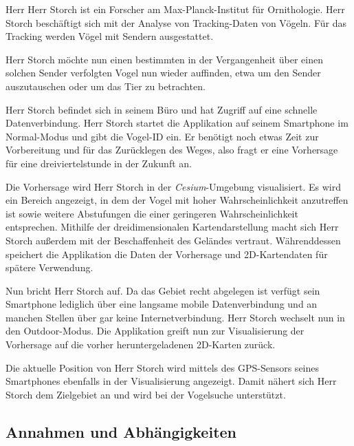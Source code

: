 \documentclass[12pt]{article} %
\begin{document}
\begin{displayquote}
\small
Herr Herr Storch ist ein Forscher am Max-Planck-Institut für Ornithologie. Herr Storch beschäftigt sich mit der Analyse von Tracking-Daten von Vögeln. Für das Tracking werden Vögel mit Sendern ausgestattet. 

Herr Storch möchte nun einen bestimmten in der Vergangenheit über einen solchen Sender verfolgten Vogel nun wieder auffinden, etwa um den Sender auszutauschen oder um das Tier zu betrachten.

Herr Storch befindet sich in seinem Büro und hat Zugriff auf eine schnelle Datenverbindung. Herr Storch startet die Applikation auf seinem Smartphone im Normal-Modus und gibt die Vogel-ID ein. Er benötigt noch etwas Zeit zur Vorbereitung und für das Zurücklegen des Weges, also fragt er eine Vorhersage für eine dreiviertelstunde in der Zukunft an.

Die Vorhersage wird Herr Storch in der \textit{Cesium}-Umgebung visualisiert. Es wird ein Bereich angezeigt, in dem der Vogel mit hoher Wahrscheinlichkeit anzutreffen ist sowie weitere Abstufungen die einer geringeren Wahrscheinlichkeit entsprechen. Mithilfe der dreidimensionalen Kartendarstellung macht sich Herr Storch außerdem mit der Beschaffenheit des Geländes vertraut. Währenddessen speichert die Applikation die Daten der Vorhersage und 2D-Kartendaten für spätere Verwendung.

Nun bricht Herr Storch auf. Da das Gebiet recht abgelegen ist verfügt sein Smartphone lediglich über eine langsame mobile Datenverbindung und an manchen Stellen über gar keine Internetverbindung. Herr Storch wechselt nun in den Outdoor-Modus. Die Applikation greift nun zur Visualisierung der Vorhersage auf die vorher heruntergeladenen 2D-Karten zurück.

Die aktuelle Position von Herr Storch wird mittels des GPS-Sensors seines Smartphones ebenfalls in der Visualisierung angezeigt. Damit nähert sich Herr Storch dem Zielgebiet an und wird bei der Vogelsuche unterstützt.
\end{displayquote}


\subsection{Annahmen und Abhängigkeiten}

\end{document}
